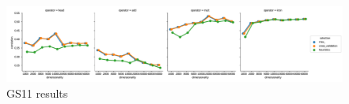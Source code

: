 \begin{figure}[t]
  \centering

    \includegraphics[width=\textwidth]{supplement/figures/gs11-results}
  \caption{GS11 results}
  \label{fig:gs14-results}
\end{figure}

